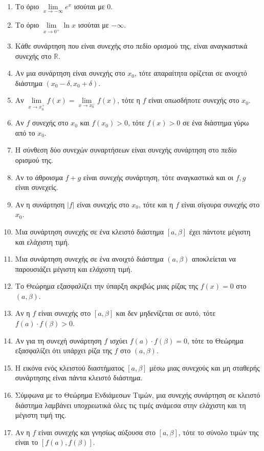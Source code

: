 \begin{enumerate}[label=\textbf{1.\arabic*.}]
    \item Το όριο $\lim\limits_{x \to -\infty} e^x$ ισούται με 0.
    \item Το όριο $\lim\limits_{x \to 0^+} \ln x$ ισούται με $-\infty$.
    \item Κάθε συνάρτηση που είναι συνεχής στο πεδίο ορισμού της, είναι αναγκαστικά συνεχής στο $\mathbb{R}$.
    \item Αν μια συνάρτηση είναι συνεχής στο $x_0$, τότε απαραίτητα ορίζεται σε ανοιχτό διάστημα $(x_0-\delta, x_0+\delta)$.
    \item Αν $\lim\limits_{x \to x_0^+} f(x) = \lim\limits_{x \to x_0^-} f(x)$, τότε η $f$ είναι οπωσδήποτε συνεχής στο $x_0$.
    \item Αν $f$ συνεχής στο $x_0$ και $f(x_0) > 0$, τότε $f(x) > 0$ σε ένα διάστημα γύρω από το $x_0$.
    \item Η σύνθεση δύο συνεχών συναρτήσεων είναι συνεχής συνάρτηση στο πεδίο ορισμού της.
    \item Αν το άθροισμα $f+g$ είναι συνεχής συνάρτηση, τότε αναγκαστικά και οι $f, g$ είναι συνεχείς.
    \item Αν η συνάρτηση $|f|$ είναι συνεχής στο $x_0$, τότε και η $f$ είναι σίγουρα συνεχής στο $x_0$.
    \item Μια συνάρτηση συνεχής σε ένα κλειστό διάστημα $[a, \beta]$ έχει πάντοτε μέγιστη και ελάχιστη τιμή.
    \item Μια συνάρτηση συνεχής σε ένα ανοιχτό διάστημα $(a, \beta)$ αποκλείεται να παρουσιάζει μέγιστη και ελάχιστη τιμή.
    \item Το Θεώρημα  εξασφαλίζει την ύπαρξη ακριβώς μιας ρίζας της $f(x)=0$ στο $(a, \beta)$.
    \item Αν η $f$ είναι συνεχής στο $[a, \beta]$ και δεν μηδενίζεται σε αυτό, τότε $f(a) \cdot f(\beta) > 0$.
    \item Αν για τη συνεχή συνάρτηση $f$ ισχύει $f(a) \cdot f(\beta) = 0$, τότε το Θεώρημα  εξασφαλίζει ότι υπάρχει ρίζα της $f$ στο $(a, \beta)$.
    \item Η εικόνα ενός κλειστού διαστήματος $[a, \beta]$ μέσω μιας συνεχούς και μη σταθερής συνάρτησης είναι πάντα κλειστό διάστημα.
    \item Σύμφωνα με το Θεώρημα Ενδιάμεσων Τιμών, μια συνεχής συνάρτηση σε κλειστό διάστημα λαμβάνει υποχρεωτικά όλες τις τιμές ανάμεσα στην ελάχιστη και τη μέγιστη τιμή της.
    \item Αν η $f$ είναι συνεχής και γνησίως αύξουσα στο $[a, \beta]$, τότε το σύνολο τιμών της είναι το $[f(a), f(\beta)]$.

\end{enumerate}
